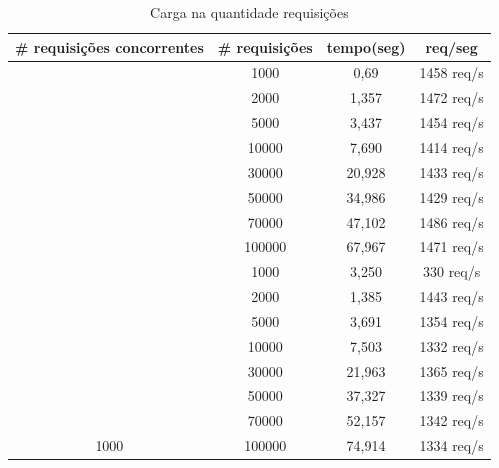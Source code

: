 \begin{table}[ht]
\centering
\begin{tabular}{|c|c|c|c|}
\hline
\# requisições concorrentes & \# requisições & tempo(seg) & req/seg      \\ \hline
\rowcolor[HTML]{EFEFEF} 
\cellcolor[HTML]{EFEFEF} & 1000 & 0,69 & 1458 req/s \\ \cline{2-4}
\rowcolor[HTML]{EFEFEF} 
\cellcolor[HTML]{EFEFEF} & 2000 & 1,357 & 1472 req/s \\ \cline{2-4}
\rowcolor[HTML]{EFEFEF} 
\cellcolor[HTML]{EFEFEF} & 5000           & 3,437      & 1454 req/s \\ \cline{2-4} 
\rowcolor[HTML]{EFEFEF} 
\cellcolor[HTML]{EFEFEF} & 10000          & 7,690      & 1414 req/s \\ \cline{2-4} 
\rowcolor[HTML]{EFEFEF} 
\cellcolor[HTML]{EFEFEF} & 30000          & 20,928     & 1433 req/s \\ \cline{2-4} 
\rowcolor[HTML]{EFEFEF} 
\cellcolor[HTML]{EFEFEF} & 50000          & 34,986     & 1429 req/s \\ \cline{2-4} 
\rowcolor[HTML]{EFEFEF} 
\cellcolor[HTML]{EFEFEF} & 70000          & 47,102     & 1486 req/s \\ \cline{2-4} 
\rowcolor[HTML]{EFEFEF}
\multirow{-8}{*}{\cellcolor[HTML]{EFEFEF}100} & 100000 & 67,967     & 1471 req/s \\ \hline
    & 1000           & 3,250      & 330 req/s  \\ \cline{2-4} 
    & 2000           & 1,385      & 1443 req/s \\ \cline{2-4} 
    & 5000           & 3,691      & 1354 req/s \\ \cline{2-4} 
    & 10000          & 7,503      & 1332 req/s \\ \cline{2-4} 
    & 30000          & 21,963     & 1365 req/s \\ \cline{2-4} 
    & 50000          & 37,327     & 1339 req/s \\ \cline{2-4} 
    & 70000          & 52,157     & 1342 req/s \\ \cline{2-4} 
\multirow{-8}{*}{1000}   & 100000         & 74,914     & 1334 req/s \\ \hline    
\end{tabular}
\caption{Carga na quantidade requisições}
\end{table}

